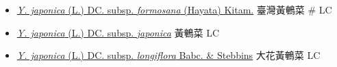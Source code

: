 \begin{itemize}
  \begin{itemize}
        \item[] \href{http://www.theplantlist.org/tpl1.1/search?q=Youngia+japonica+subsp.+formosana}{\textit{Y. japonica} (L.) DC. subsp. \textit{formosana} (Hayata) Kitam.}   臺灣黃鵪菜  \# LC
        \item[] \href{http://www.theplantlist.org/tpl1.1/search?q=Youngia+japonica+subsp.+japonica}{\textit{Y. japonica} (L.) DC. subsp. \textit{japonica}}   黃鵪菜   LC
        \item[] \href{http://www.theplantlist.org/tpl1.1/search?q=Youngia+japonica+subsp.+longiflora}{\textit{Y. japonica} (L.) DC. subsp. \textit{longiflora} Babc. \& Stebbins}   大花黃鵪菜   LC
  \end{itemize}
  \end{itemize}
